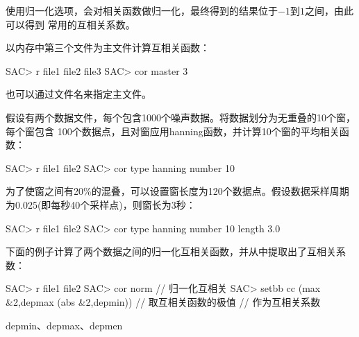 使用归一化选项，会对相关函数做归一化，最终得到的结果位于$-1$到$1$之间，由此可以得到
常用的互相关系数。

以内存中第三个文件为主文件计算互相关函数：
\begin{SACCode}
SAC> r file1 file2 file3
SAC> cor master 3
\end{SACCode}
也可以通过文件名来指定主文件。

假设有两个数据文件，每个包含1000个噪声数据。将数据划分为无重叠的10个窗，每个窗包含
100个数据点，且对窗应用hanning函数，并计算10个窗的平均相关函数：
\begin{SACCode}
SAC> r file1 file2
SAC> cor type hanning number 10
\end{SACCode}

为了使窗之间有20\%的混叠，可以设置窗长度为120个数据点。假设数据采样周期为0.025(即每秒40个采样点)，则窗长为3秒：
\begin{SACCode}
SAC> r file1 file2
SAC> cor type hanning number 10 length 3.0
\end{SACCode}

下面的例子计算了两个数据之间的归一化互相关函数，并从中提取出了互相关系数：
\begin{SACCode}
SAC> r file1 file2
SAC> cor norm                                   // 归一化互相关
SAC> setbb cc (max &2,depmax (abs &2,depmin))   // 取互相关函数的极值
                                                // 作为互相关系数
\end{SACCode}

depmin、depmax、depmen
